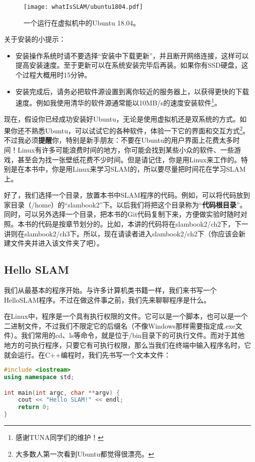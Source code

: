\begin{figure}[!ht]
	\centering
	\texttt{[image: whatIsSLAM/ubuntu1804.pdf]}
	\caption{一个运行在虚拟机中的Ubuntu 18.04。}
	\label{fig:ubuntu1804}
\end{figure}

关于安装的小提示：
\begin{itemize}
	\item 安装操作系统时请不要选择“安装中下载更新”，并且断开网络连接，这样可以提高安装速度。至于更新可以在系统安装完毕后再装。如果你有SSD硬盘，这个过程大概用时15分钟。
	\item 安装完成后，请务必把软件源设置到离你较近的服务器上，以获得更快的下载速度。例如我使用清华的软件源通常能以10MB/s的速度安装软件\footnote{感谢TUNA同学们的维护！}。
\end{itemize}

现在，假设你已经成功安装好Ubuntu，无论是使用虚拟机还是双系统的方式。如果你还不熟悉Ubuntu，可以试试它的各种软件，体验一下它的界面和交互方式\footnote{大多数人第一次看到Ubuntu都觉得很漂亮。}。不过我必须\textbf{提醒}你，特别是新手朋友：不要在Ubuntu的用户界面上花费太多时间！Linux有许多可能浪费时间的地方，你可能会找到某些小众的软件、一些游戏，甚至会为找一张壁纸花费不少时间。但是请记住，你是用Linux来工作的。特别是在本书中，你是用Linux来学习SLAM的，所以要尽量把时间花在学习SLAM上。

好了，我们选择一个目录，放置本书中SLAM程序的代码。例如，可以将代码放到家目录（/home）的“slambook2”下。以后我们将把这个目录称为“\textbf{代码根目录}”。同时，可以另外选择一个目录，把本书的Git代码复制下来，方便做实验时随时对照。本书的代码是按章节划分的。比如，本讲的代码将在slambook2/ch2下，下一讲则在slambook2/ch3下。所以，现在请读者进入slambook2/ch2下（你应该会新建文件夹并进入该文件夹\mbox{了吧）。}

\subsection{Hello SLAM}
我们从最基本的程序开始。与许多计算机类书籍一样，我们来书写一个HelloSLAM程序。不过在做这件事之前，我们先来聊聊程序是什么。

在Linux中，程序是一个具有执行权限的文件。它可以是一个脚本，也可以是一个二进制文件，不过我们不限定它的后缀名（不像Windows那样需要指定成.exe文件）。我们常用的cd、ls等命令，就是位于/bin目录下的可执行文件。而对于其他地方的可执行程序，只要它有可执行权限，那么当我们在终端中输入程序名时，它就会运行。在C++编程时，我们先书写一个文本文件：

\begin{lstlisting}[language=C++,caption=slambook2/ch2/helloSLAM.cpp]
#include <iostream>
using namespace std;

int main(int argc, char **argv) {
	cout << "Hello SLAM!" << endl;
	return 0;
}
\end{lstlisting}

